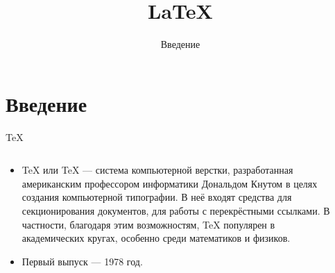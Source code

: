 \documentclass[10pt,aspectratio=169]{beamer}
\title{\LaTeX}
\subtitle{Введение}
\begin{document}
    \maketitle

    \section{Введение}
    
    \begin{frame}{\TeX}
    	\begin{columns}
    		\begin{column}{0.6\textwidth}
    			\begin{itemize}
    			\item TeX или \TeX \hspace{0.4mm} --- система компьютерной верстки, разработанная американским профессором информатики Дональдом Кнутом в целях создания компьютерной типографии. В неё входят средства для секционирования документов, для работы с перекрёстными ссылками. В частности, благодаря этим возможностям, TeX популярен в академических кругах, особенно среди математиков и физиков.
    			\item Первый выпуск --- 1978 год.
    			\end{itemize}
    		\end{column}
    		\begin{column}{0.25\textwidth}
    			\begin{figure}[h!]
    				\centering

\end{figure}
\end{column}
\end{columns}
\end{frame}
\end{document}
